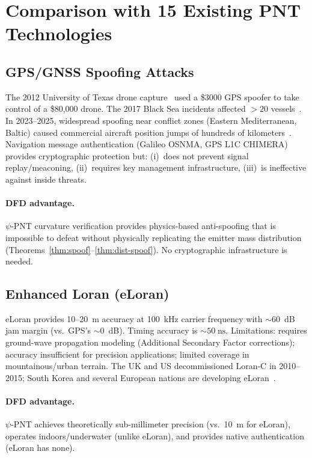 \documentclass[twocolumn,superscriptaddress,prd,nofootinbib]{revtex4-2}
\begin{document}
\section{Comparison with 15 Existing PNT Technologies}
\label{sec:comparison}

\subsection{GPS/GNSS Spoofing Attacks}

The 2012 University of Texas drone capture~\cite{Humphreys2012} used a
\$3000 GPS spoofer to take control of a \$80,000 drone. The 2017 Black
Sea incidents affected $>20$ vessels~\cite{CRGroup2017}. In 2023--2025,
widespread spoofing near conflict zones (Eastern Mediterranean, Baltic)
caused commercial aircraft position jumps of hundreds of
kilometers~\cite{Psiaki2016Spoofing}. Navigation message authentication
(Galileo OSNMA, GPS L1C CHIMERA) provides cryptographic protection but:
(i)~does not prevent signal replay/meaconing,
(ii)~requires key management infrastructure,
(iii)~is ineffective against inside threats.

\paragraph{DFD advantage.}
$\psi$-PNT curvature verification provides physics-based anti-spoofing
that is impossible to defeat without physically replicating the emitter
mass distribution (Theorems~\ref{thm:spoof}--\ref{thm:dist-spoof}). No
cryptographic infrastructure is needed.

\subsection{Enhanced Loran (eLoran)}

eLoran provides 10--20~m accuracy at 100~kHz carrier frequency with
$\sim 60$~dB jam margin (vs.\ GPS's $\sim 0$~dB). Timing accuracy is
$\sim 50\;\text{ns}$. Limitations: requires ground-wave propagation
modeling (Additional Secondary Factor corrections); accuracy insufficient
for precision applications; limited coverage in mountainous/urban terrain.
The UK and US decommissioned Loran-C in 2010--2015; South Korea and
several European nations are developing
eLoran~\cite{Johnson2014eLoran}.

\paragraph{DFD advantage.}
$\psi$-PNT achieves theoretically sub-millimeter precision (vs.\ 10~m
for eLoran), operates indoors/underwater (unlike eLoran), and provides
native authentication (eLoran has none).
\end{document}
